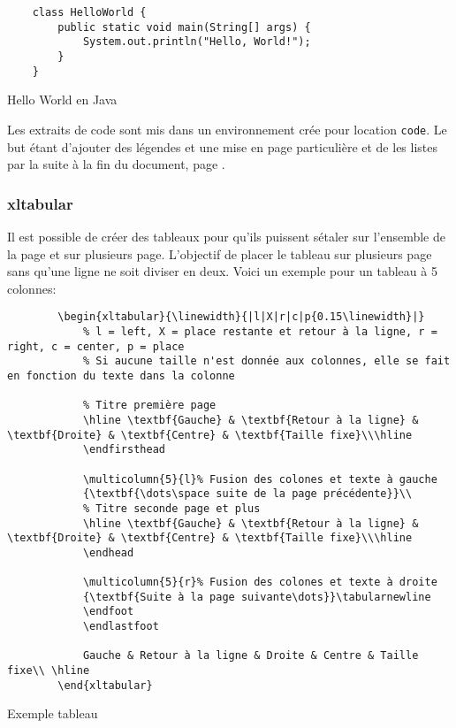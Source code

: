 \begin{code}
    \begin{verbatim}
    class HelloWorld {
        public static void main(String[] args) {
            System.out.println("Hello, World!");
        }
    }
\end{verbatim}
    \caption{Hello World en Java}
\end{code}

Les extraits de code sont mis dans un environnement crée pour location \verb=code=.
Le but étant d'ajouter des légendes et une mise en page particulière et de les listes par la suite à la fin du document,
page \pageref{TableOfCode}.

\subsubsection{xltabular}
Il est possible de créer des tableaux pour qu'ils puissent sétaler sur l'ensemble de la page et sur plusieurs page.
L'objectif de placer le tableau sur plusieurs page sans qu'une ligne ne soit diviser en deux.
Voici un exemple pour un tableau à 5 colonnes:
\begin{code}
    \begin{verbatim}
        \begin{xltabular}{\linewidth}{|l|X|r|c|p{0.15\linewidth}|}
            % l = left, X = place restante et retour à la ligne, r = right, c = center, p = place
            % Si aucune taille n'est donnée aux colonnes, elle se fait en fonction du texte dans la colonne

            % Titre première page
            \hline \textbf{Gauche} & \textbf{Retour à la ligne} & \textbf{Droite} & \textbf{Centre} & \textbf{Taille fixe}\\\hline
            \endfirsthead

            \multicolumn{5}{l}% Fusion des colones et texte à gauche
            {\textbf{\dots\space suite de la page précédente}}\\
            % Titre seconde page et plus
            \hline \textbf{Gauche} & \textbf{Retour à la ligne} & \textbf{Droite} & \textbf{Centre} & \textbf{Taille fixe}\\\hline
            \endhead

            \multicolumn{5}{r}% Fusion des colones et texte à droite
            {\textbf{Suite à la page suivante\dots}}\tabularnewline
            \endfoot
            \endlastfoot

            Gauche & Retour à la ligne & Droite & Centre & Taille fixe\\ \hline
        \end{xltabular}
\end{verbatim}
    \caption{Exemple tableau}
\end{code}

